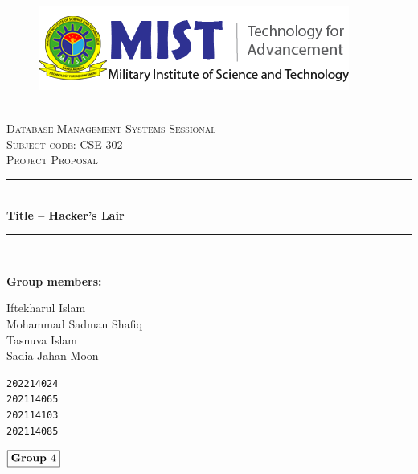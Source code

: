 \documentclass[12pt]{article}
\newcommand{\HRule}{\rule{\linewidth}{0.5mm}} %
\begin{document}
\begin{center}
    \begin{figure}
        \centering
        \includegraphics[width=0.75\linewidth]{logo.png}
        \label{fig:enter-label}
    \end{figure}
    \mbox{}\\[2.0cm]
    \textsc{\Huge Database Management Systems Sessional}\\[2.5cm]
    \textsc{\Large Subject code: CSE-302}\\[2.0cm]
    \textsc{\LARGE Project Proposal}\\[2.0cm]
    \HRule\\[0.4cm]
    {\Large \bf {Title -- Hacker's Lair}}\\[0.2cm]
    \HRule\\[1.5cm]
\end{center}

\begin{flushleft}
    \textbf{\large Group members:}
\end{flushleft}

\begin{center}
    \begin{minipage}{0.5\textwidth}
        \begin{flushleft}
            \large Iftekharul Islam\\
            \large Mohammad Sadman Shafiq\\
            \large Tasnuva Islam\\
            \large Sadia Jahan Moon\\
        \end{flushleft}
    \end{minipage}%
    \begin{minipage}{0.5\textwidth}
        \begin{flushright}
            {\texttt{\large 202214024\\}}
            {\texttt{\large 202114065\\}}
            {\texttt{\large 202114103\\}}
            {\texttt{\large 202114085\\}}
        \end{flushright}
    \end{minipage}
\end{center}
\begin{flushleft}
    \large $\boxed{\text{\bf Group } 4}$\\[4.0cm]
\end{flushleft}
    
\end{document}
